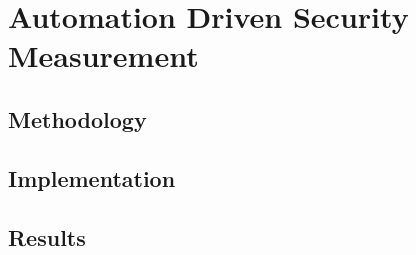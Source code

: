 
\chapter{Automation Driven Security Measurement} \label{ch:automation}



\section{Methodology}\label{sec:automation:methodology}



\section{Implementation}\label{sec:automation:secmet_impl}




\section{Results}\label{sec:automation:results}





% 

